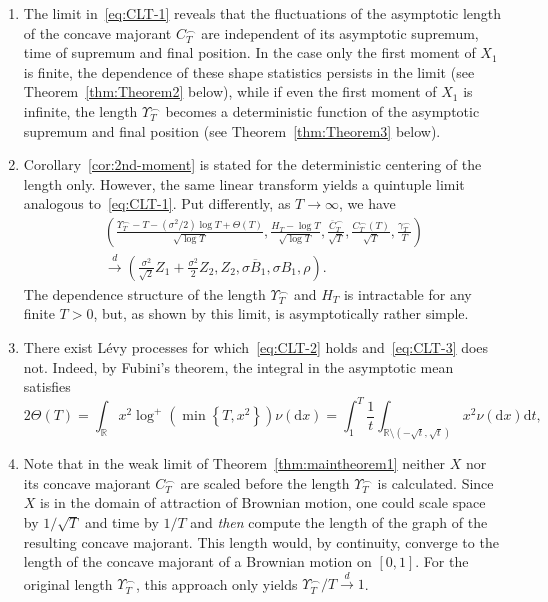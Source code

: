 \documentclass[AHL,Unicode,longabstracts,published]{cedram}
\newcommand\R{\mathbb{R}}
\newcommand\1{\mathds{1}}
\newcommand\D{\mathrm{d}}
\newcommand\cid{\xrightarrow{d}}
\newcommand\ov[1]{\overline{#1}}
\newcommand*{\romanenumi}{\renewcommand*{\theenumi}{\roman{enumi}}}
\begin{document}
\begin{rema}
\leavevmode
\begin{enumerate}\romanenumi
\item\label{rema1.3.i} The limit in~\eqref{eq:CLT-1} reveals that the fluctuations of the asymptotic length of the concave majorant $C_T^\frown$ are independent of its asymptotic supremum, time of supremum and final position. In the case only the first moment of $X_1$ is finite, the dependence of these shape statistics persists in the limit (see Theorem~\ref{thm:Theorem2} below), while if even the first moment of $X_1$ is infinite, the length $\Upsilon_T^\frown$ becomes a deterministic function of the asymptotic supremum and final position (see Theorem~\ref{thm:Theorem3} below).
\item\label{rema1.3.ii} Corollary~\ref{cor:2nd-moment} is stated for the deterministic centering of the length only. However, the same linear transform yields a quintuple limit analogous to~\eqref{eq:CLT-1}. Put differently, as $T\to\infty$, we have
\begin{multline*}
\left(
\frac{\Upsilon_T^{\frown} -T-\left(\sigma^2/2\right)\log T +\Theta(T)}{\sqrt{\log T}},
\frac{H_T-\log T}{\sqrt{\log T}},
\frac{\ov{C}^\frown_T}{\sqrt{T}},
\frac{C^\frown_T(T)}{\sqrt{T}},
\frac{\gamma^\frown_T}{T}
\right)\\
\cid
\left(
\frac{\sigma^2}{\sqrt{2}}Z_1+\frac{\sigma^2}{2}Z_2, Z_2,
\sigma\ov B_1,
\sigma B_1,
\rho
\right).
\end{multline*}
The dependence structure of the length $\Upsilon_T^\frown$ and $H_T$ is intractable for any finite $T>0$, but, as shown by this limit, is asymptotically rather simple.
\item\label{rema1.3.iii} There exist Lévy processes for which~\eqref{eq:CLT-2} holds and~\eqref{eq:CLT-3} does not. Indeed, by Fubini's theorem, the integral in the asymptotic mean satisfies
\[
2\Theta(T) =\int_\R x^2\log^+\left(\min\left\{T, x^2\right\}\right)\nu(\D x) =\int_1^T\frac{1}{t}\int_{\R\setminus\left(-\sqrt{t},\sqrt{t}\right)} x^2\nu(\D x)\D t,
\]
\item\label{rema1.3.iv} Note that in the weak limit of Theorem~\ref{thm:maintheorem1} neither $X$ nor its concave majorant $C_T^\frown$ are scaled before the length $\Upsilon_T^\frown$ is calculated. Since $X$ is in the domain of attraction of Brownian motion, one could scale space by $1/\sqrt{T}$ and time by $1/T$ and \emph{then} compute the length of the graph of the resulting concave majorant. This length would, by continuity, converge to the length of the concave majorant of a Brownian motion on $[0,1]$. For the original length $\Upsilon_T^\frown$, this approach only yields $\Upsilon_T^\frown/T\cid 1$.

\end{enumerate}
\end{rema}
\end{document}
